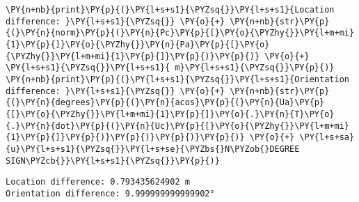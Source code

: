 \documentclass[a4paper]{scrreprt}
\begin{document}
\begin{Verbatim}[commandchars=\\\{\}]
\PY{n+nb}{print}\PY{p}{(}\PY{l+s+s1}{\PYZsq{}}\PY{l+s+s1}{Location difference: }\PY{l+s+s1}{\PYZsq{}} \PY{o}{+} \PY{n+nb}{str}\PY{p}{(}\PY{n}{norm}\PY{p}{(}\PY{n}{Pc}\PY{p}{[}\PY{o}{\PYZhy{}}\PY{l+m+mi}{1}\PY{p}{]}\PY{o}{\PYZhy{}}\PY{n}{Pa}\PY{p}{[}\PY{o}{\PYZhy{}}\PY{l+m+mi}{1}\PY{p}{]}\PY{p}{)}\PY{p}{)} \PY{o}{+} \PY{l+s+s1}{\PYZsq{}}\PY{l+s+s1}{ m}\PY{l+s+s1}{\PYZsq{}}\PY{p}{)}
\PY{n+nb}{print}\PY{p}{(}\PY{l+s+s1}{\PYZsq{}}\PY{l+s+s1}{Orientation difference: }\PY{l+s+s1}{\PYZsq{}} \PY{o}{+} \PY{n+nb}{str}\PY{p}{(}\PY{n}{degrees}\PY{p}{(}\PY{n}{acos}\PY{p}{(}\PY{n}{Ua}\PY{p}{[}\PY{o}{\PYZhy{}}\PY{l+m+mi}{1}\PY{p}{]}\PY{o}{.}\PY{n}{T}\PY{o}{.}\PY{n}{dot}\PY{p}{(}\PY{n}{Uc}\PY{p}{[}\PY{o}{\PYZhy{}}\PY{l+m+mi}{1}\PY{p}{]}\PY{p}{)}\PY{p}{)}\PY{p}{)}\PY{p}{)} \PY{o}{+} \PY{l+s+sa}{u}\PY{l+s+s1}{\PYZsq{}}\PY{l+s+se}{\PYZbs{}N\PYZob{}DEGREE SIGN\PYZcb{}}\PY{l+s+s1}{\PYZsq{}}\PY{p}{)}
\end{Verbatim}



\begin{Verbatim}[commandchars=\\\{\},frame=single]
Location difference: 0.793435624902 m
Orientation difference: 9.999999999999902°
\end{Verbatim}

\begin{center}
\end{center}
{ \hspace*{\fill} \\}

%


\end{document}
